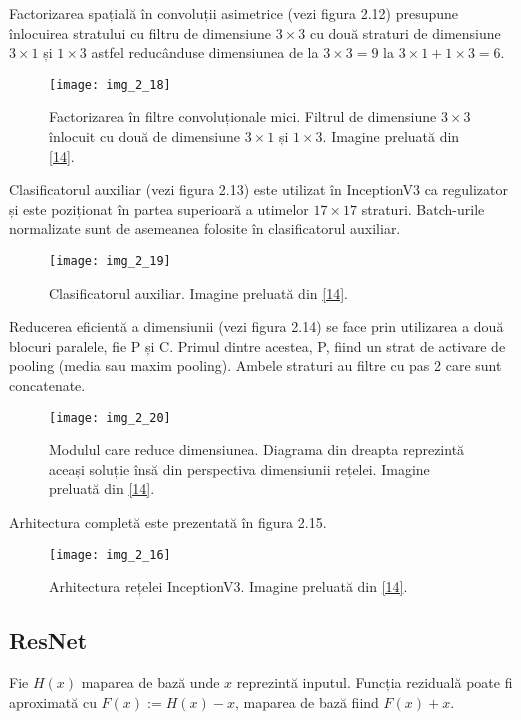 Factorizarea spațială în convoluții asimetrice (vezi figura 2.12) presupune înlocuirea stratului cu filtru de dimensiune $3 \times 3$ cu două straturi de dimensiune $3 \times 1$ și $1 \times 3$ astfel reducânduse dimensiunea de la $3 \times 3 = 9$ la $3 \times 1 + 1 \times 3 = 6$. 
\begin{figure}[!h]
	\centering
	\texttt{[image: img\_2\_18]}
	\caption[Factorizarea spațială în convoluții asimetrice]{Factorizarea în filtre convoluționale mici. Filtrul de dimensiune $3 \times 3$ înlocuit cu două de dimensiune $3 \times 1$ și $1 \times 3$.  Imagine preluată din \hyperlink{guideinceptionv3}{[14]}.}
\end{figure}

Clasificatorul auxiliar (vezi figura 2.13) este utilizat în InceptionV3 ca regulizator și este poziționat în partea superioară a utimelor $17 \times 17$ straturi. Batch-urile normalizate sunt de asemeanea folosite în clasificatorul auxiliar.
\begin{figure}[!h]
	\centering
	\texttt{[image: img\_2\_19]}
	\caption[Clasificator auxiliar]{Clasificatorul auxiliar. Imagine preluată din \hyperlink{guideinceptionv3}{[14]}.}
\end{figure}

Reducerea eficientă a dimensiunii (vezi figura 2.14) se face prin utilizarea a două blocuri paralele, fie P și C. Primul dintre acestea, P, fiind un strat de activare de pooling (media sau maxim pooling). Ambele straturi au filtre cu pas 2 care sunt concatenate.
\begin{figure}[!h]
	\centering
	\texttt{[image: img\_2\_20]}
	\caption[Reducerea eficientă a dimensiunii]{Modulul care reduce dimensiunea. Diagrama din dreapta reprezintă aceași soluție însă din perspectiva dimensiunii rețelei. Imagine preluată din \hyperlink{guideinceptionv3}{[14]}.}
\end{figure}   

Arhitectura completă este prezentată în figura 2.15.
\begin{figure}[!h]
	\centering
	\texttt{[image: img\_2\_16]}
	\caption[Arhitectura InceptionV3]{Arhitectura rețelei InceptionV3. Imagine preluată din \hyperlink{guideinceptionv3}{[14]}.}
\end{figure}   


\subsection{ResNet}
Fie $H(x)$ maparea de bază unde $x$ reprezintă inputul. Funcția reziduală poate fi aproximată cu $F(x) := H(x) - x$, maparea de bază fiind $F(x) + x$.


